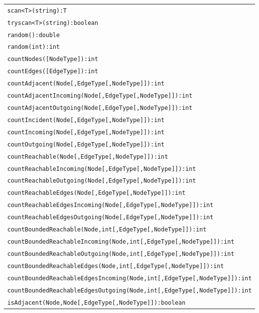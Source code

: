 \begin{table}[htbp]
\centering
\begin{tabular}{|l|}
\hline
\texttt{scan<T>(string):T}\\
\texttt{tryscan<T>(string):boolean}\\
\hline
\texttt{random():double}\\
\texttt{random(int):int}\\
\hline
\texttt{countNodes([NodeType]):int}\\
\texttt{countEdges([EdgeType]):int}\\
\hline
\texttt{countAdjacent(Node[,EdgeType[,NodeType]]):int}\\
\texttt{countAdjacentIncoming(Node[,EdgeType[,NodeType]]):int}\\
\texttt{countAdjacentOutgoing(Node[,EdgeType[,NodeType]]):int}\\
\texttt{countIncident(Node[,EdgeType[,NodeType]]):int}\\
\texttt{countIncoming(Node[,EdgeType[,NodeType]]):int}\\
\texttt{countOutgoing(Node[,EdgeType[,NodeType]]):int}\\
\hline
\texttt{countReachable(Node[,EdgeType[,NodeType]]):int}\\
\texttt{countReachableIncoming(Node[,EdgeType[,NodeType]]):int}\\
\texttt{countReachableOutgoing(Node[,EdgeType[,NodeType]]):int}\\
\texttt{countReachableEdges(Node[,EdgeType[,NodeType]]):int}\\
\texttt{countReachableEdgesIncoming(Node[,EdgeType[,NodeType]]):int}\\
\texttt{countReachableEdgesOutgoing(Node[,EdgeType[,NodeType]]):int}\\
\hline
\texttt{countBoundedReachable(Node,int[,EdgeType[,NodeType]]):int}\\
\texttt{countBoundedReachableIncoming(Node,int[,EdgeType[,NodeType]]):int}\\
\texttt{countBoundedReachableOutgoing(Node,int[,EdgeType[,NodeType]]):int}\\
\texttt{countBoundedReachableEdges(Node,int[,EdgeType[,NodeType]]):int}\\
\texttt{countBoundedReachableEdgesIncoming(Node,int[,EdgeType[,NodeType]]):int}\\
\texttt{countBoundedReachableEdgesOutgoing(Node,int[,EdgeType[,NodeType]]):int}\\
\hline
\texttt{isAdjacent(Node,Node[,EdgeType[,NodeType]]):boolean}\\

\end{tabular}
\end{table}
